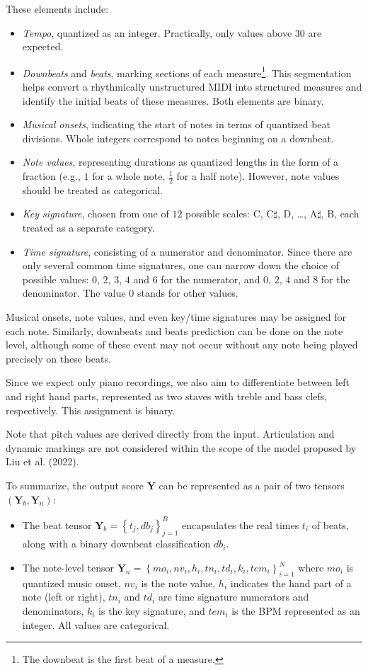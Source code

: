 These elements include:
\begin{itemize}
	\item \emph{Tempo}, quantized as an integer. Practically, only values above $30$ are expected.
	\item \emph{Downbeats} and \emph{beats}, marking sections of each measure\footnote{The downbeat is the first beat of a measure.}. This segmentation helps convert a rhythmically unstructured MIDI into structured measures and identify the initial beats of these measures. Both elements are binary.
	\item \emph{Musical onsets}, indicating the start of notes in terms of quantized beat divisions. Whole integers correspond to notes beginning on a downbeat.
	\item \emph{Note values}, representing durations as quantized lengths in the form of a fraction (e.g., $1$ for a whole note, $\frac{1}{2}$ for a half note). However, note values should be treated as categorical.
	\item \emph{Key signature}, chosen from one of $12$ possible scales: $\textrm{C}$, $\textrm{C}\sharp$, $\textrm{D}$, \ldots, $\textrm{A}\sharp$, $\textrm{B}$, each treated as a separate category.
	\item \emph{Time signature}, consisting of a numerator and denominator. Since there are only several common time signatures, one can narrow down the choice of possible values: $0$, $2$, $3$, $4$ and $6$ for the numerator, and $0$, $2$, $4$ and $8$ for the denominator. The value $0$ stands for other values.
\end{itemize}

Musical onsets, note values, and even key/time signatures may be assigned for each note. Similarly, downbeats and beats prediction can be done on the note level, although some of these event may not occur without any note being played precisely on these beats.

Since we expect only piano recordings, we also aim to differentiate between left and right hand parts, represented as two staves with treble and bass clefs, respectively. This assignment is binary.

Note that pitch values are derived directly from the input. Articulation and dynamic markings are not considered within the scope of the model proposed by Liu et al. (2022).

To summarize, the output score $\mathbf{Y}$ can be represented as a pair of two tensors $\left(\mathbf{Y}_b, \mathbf{Y}_n\right)$:
\begin{itemize}
	\item The beat tensor $\mathbf{Y}_b = \left\{t_j, db_j\right\}_{j=1}^B$ encapsulates the real times $t_i$ of beats, along with a binary downbeat classification $db_i$.
	\item The note-level tensor $\mathbf{Y}_n=\left\{mo_i, nv_i, h_i, tn_i, td_i, k_i, tem_i\right\}_{i=1}^N$ where $mo_i$ is quantized music onset, $nv_i$ is the note value, $h_i$ indicates the hand part of a note (left or right), $tn_i$ and $td_i$ are time signature numerators and denominators, $k_i$ is the key signature, and $tem_i$ is the BPM represented as an integer. All values are categorical.
\end{itemize}


